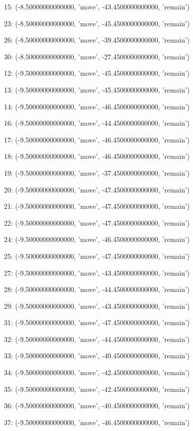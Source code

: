 15: (-8.50000000000000, 'move', -43.4500000000000, 'remain')


23: (-8.50000000000000, 'move', -45.4500000000000, 'remain')


26: (-8.50000000000000, 'move', -39.4500000000000, 'remain')


30: (-8.50000000000000, 'move', -27.4500000000000, 'remain')


12: (-9.50000000000000, 'move', -45.4500000000000, 'remain')


13: (-9.50000000000000, 'move', -45.4500000000000, 'remain')


14: (-9.50000000000000, 'move', -46.4500000000000, 'remain')


16: (-9.50000000000000, 'move', -44.4500000000000, 'remain')


17: (-9.50000000000000, 'move', -46.4500000000000, 'remain')


18: (-9.50000000000000, 'move', -46.4500000000000, 'remain')


19: (-9.50000000000000, 'move', -37.4500000000000, 'remain')


20: (-9.50000000000000, 'move', -47.4500000000000, 'remain')


21: (-9.50000000000000, 'move', -47.4500000000000, 'remain')


22: (-9.50000000000000, 'move', -47.4500000000000, 'remain')


24: (-9.50000000000000, 'move', -46.4500000000000, 'remain')


25: (-9.50000000000000, 'move', -47.4500000000000, 'remain')


27: (-9.50000000000000, 'move', -43.4500000000000, 'remain')


28: (-9.50000000000000, 'move', -44.4500000000000, 'remain')


29: (-9.50000000000000, 'move', -43.4500000000000, 'remain')


31: (-9.50000000000000, 'move', -47.4500000000000, 'remain')


32: (-9.50000000000000, 'move', -44.4500000000000, 'remain')


33: (-9.50000000000000, 'move', -40.4500000000000, 'remain')


34: (-9.50000000000000, 'move', -42.4500000000000, 'remain')


35: (-9.50000000000000, 'move', -42.4500000000000, 'remain')


36: (-9.50000000000000, 'move', -40.4500000000000, 'remain')


37: (-9.50000000000000, 'move', -46.4500000000000, 'remain')


